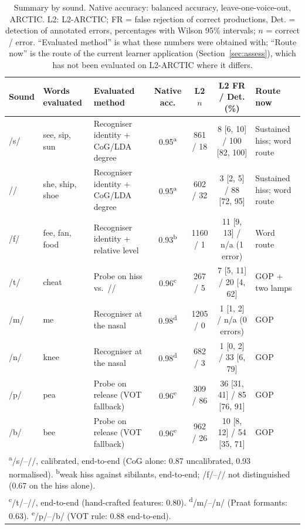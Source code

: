 \documentclass[conference]{IEEEtran}
\newcommand{\ipa}[1]{/#1/}
\begin{document}
\begin{table}[!t]
\caption{Summary by sound. Native accuracy: balanced accuracy, leave-one-voice-out, ARCTIC. L2: L2-ARCTIC; FR = false rejection of correct productions, Det. = detection of annotated errors, percentages with Wilson 95\% intervals; $n$ = correct / error. ``Evaluated method'' is what these numbers were obtained with; ``Route now'' is the route of the current learner application (Section~\ref{sec:assess}), which has not been evaluated on L2-ARCTIC where it differs.}
\label{tab:summary}
\centering
\footnotesize
\begin{tabular}{lllcccl}
\toprule
Sound & Words evaluated & Evaluated method & Native acc. & L2 $n$ & L2 FR / Det. (\%) & Route now \\
\midrule
\ipa{s} & see, sip, sun & Recogniser identity + CoG/LDA degree & 0.95\textsuperscript{a} & 861 / 18 & 8 [6, 10] / 100 [82, 100] & Sustained hiss; word route \\
\ipa{\textesh} & she, ship, shoe & Recogniser identity + CoG/LDA degree & 0.95\textsuperscript{a} & 602 / 32 & 3 [2, 5] / 88 [72, 95] & Sustained hiss; word route \\
\ipa{f} & fee, fan, food & Recogniser identity + relative level & 0.93\textsuperscript{b} & 1160 / 1 & 11 [9, 13] / n/a (1 error) & Word route \\
\ipa{t\textesh} & cheat & Probe on hiss vs.\ \ipa{\textesh} & 0.96\textsuperscript{c} & 267 / 5 & 7 [5, 11] / 20 [4, 62] & GOP + two lamps \\
\ipa{m} & me & Recogniser at the nasal & 0.98\textsuperscript{d} & 1205 / 0 & 1 [1, 2] / n/a (0 errors) & GOP \\
\ipa{n} & knee & Recogniser at the nasal & 0.98\textsuperscript{d} & 682 / 3 & 1 [0, 2] / 33 [6, 79] & GOP \\
\ipa{p} & pea & Probe on release (VOT fallback) & 0.96\textsuperscript{e} & 309 / 86 & 36 [31, 41] / 85 [76, 91] & GOP \\
\ipa{b} & bee & Probe on release (VOT fallback) & 0.96\textsuperscript{e} & 962 / 26 & 10 [8, 12] / 54 [35, 71] & GOP \\
\bottomrule
\multicolumn{7}{l}{\scriptsize \textsuperscript{a}\ipa{s}--\ipa{\textesh}, calibrated, end-to-end (CoG alone: 0.87 uncalibrated, 0.93 normalised). \textsuperscript{b}weak hiss against sibilants, end-to-end; \ipa{f}--\ipa{\texttheta} not distinguished (0.67 on the hiss alone).} \\
\multicolumn{7}{l}{\scriptsize \textsuperscript{c}\ipa{t\textesh}--\ipa{\textesh}, end-to-end (hand-crafted features: 0.80). \textsuperscript{d}\ipa{m}--\ipa{n} (Praat formants: 0.63). \textsuperscript{e}\ipa{p}--\ipa{b} (VOT rule: 0.88 end-to-end).} \\
\end{tabular}
\end{table}
\end{document}
